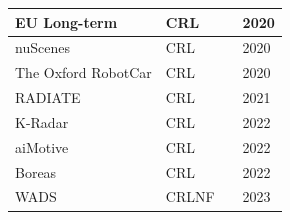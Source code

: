 \documentclass[rnd]{mas_proposal}
\begin{document}
\begin{itemize}
\begin{table}[h]
\begin{tabular}{|l|l|l|l|}
                  EU Long-term        & CRL              & \cite{yan2020eu}            & 2020          \\ \hline
                  nuScenes            & CRL              & \cite{caesar2020nuscenes}   & 2020          \\ \hline
                  The Oxford RobotCar & CRL              & \cite{barnes2020oxford}     & 2020          \\ \hline
                  RADIATE             & CRL              & \cite{sheeny2021radiate}    & 2021          \\ \hline
                  K-Radar             & CRL              & \cite{Paek2022Jun}          & 2022          \\ \hline
                  aiMotive            & CRL              & \cite{matuszka2022aimotive} & 2022          \\ \hline
                  Boreas              & CRL              & \cite{burnett2022boreas}    & 2022          \\ \hline
                  WADS                & CRLNF            & \cite{kurup2022winter}      & 2023          \\ \hline
              \end{tabular}
          \end{table}





\end{itemize}
\end{document}
